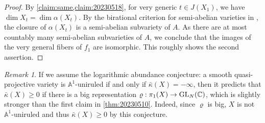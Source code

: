 \documentclass[english]{amsproc}
\theoremstyle{plain}
\theoremstyle{definition}
\theoremstyle{remark}
\newtheorem{rem}[thm]{Remark}
\theoremstyle{plain}
\numberwithin{equation}{thm} %
\newcommand{\bA}{\mathbb{A}}
\newcommand{\bC}{\mathbb{C}}
\begin{document}
\begin{proof}
			By \cref{claim:same,claim:20230518}, for very generic $t\in J(X_1)$, we have $\dim X_t=\dim \alpha(X_t)$. By the birational criterion for semi-abelian varieties in \cite[Proof of Lemma 1.4]{CDY25}, the closure of $\alpha(X_t)$ is a semi-abelian subvariety of $A$. As there are at most countably many semi-abelian subvarieties of $A$, we conclude that the images of the very general fibers of $f_1$ are isomorphic.  
			  This roughly shows the second assertion.    
		\end{proof}
		
		\begin{rem}
			If we assume the logarithmic abundance conjecture: a smooth quasi-projective variety is $\bA^1$-uniruled if and only if $\bar{\kappa}(X)=-\infty$, then it predicts that   $\bar{\kappa}(X)\geq 0$ if there is a big representation $\varrho:\pi_1(X)\to {\rm GL}_N(\bC)$, which is slightly stronger than the first claim in \cref{thm:20230510}. Indeed, since $\varrho$ is big, $X$ is not $\bA^1$-uniruled and thus $\bar{\kappa}(X)\geq 0$ by this conjecture.  
		\end{rem}
		
		\medspace
		
		
		
\end{document}
